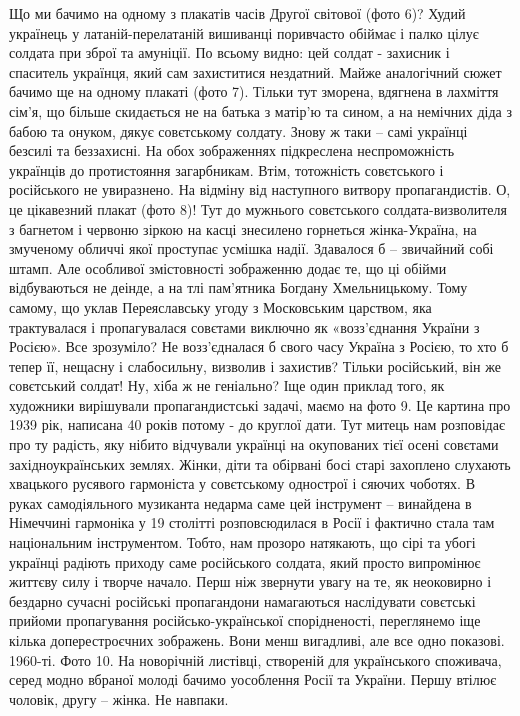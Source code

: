 Що ми бачимо на одному з плакатів часів Другої світової (фото 6)? Худий українець у латаній-перелатаній вишиванці поривчасто обіймає і палко цілує солдата при зброї та амуніції.  По всьому видно: цей солдат - захисник і спаситель українця, який сам захиститися нездатний. Майже аналогічний сюжет бачимо ще на одному плакаті (фото 7). Тільки тут зморена, вдягнена в лахміття сім’я, що більше скидається не на батька з матір’ю та сином, а на немічних діда з бабою та онуком, дякує совєтському  солдату. Знову ж таки – самі українці безсилі та беззахисні. 
На обох зображеннях підкреслена неспроможність українців до протистояння загарбникам. Втім, тотожність совєтського і російського не увиразнено. На відміну від наступного витвору пропагандистів. 
О, це цікавезний плакат (фото 8)! Тут до мужнього совєтського солдата-визволителя з багнетом і червоню зіркою на касці знесилено горнеться жінка-Україна, на змученому обличчі якої проступає усмішка надії. Здавалося б – звичайний собі штамп. Але особливої змістовності зображенню додає те, що ці обійми відбуваються не деінде, а на тлі пам’ятника Богдану Хмельницькому. Тому самому, що уклав Переяславську угоду з Московським царством, яка трактувалася і пропагувалася совєтами виключно як «возз’єднання України з Росією». Все зрозуміло? Не возз’єдналася б свого часу Україна з Росією, то хто б тепер її, нещасну і слабосильну, визволив і захистив? Тільки російський, він же совєтський солдат! Ну, хіба ж не геніально?
Іще один приклад того, як художники вирішували пропагандистські задачі, маємо на фото 9. Це картина про 1939 рік, написана 40 років потому - до круглої дати. Тут митець нам розповідає про ту радість, яку нібито відчували українці на окупованих тієї осені совєтами західноукраїнських землях. Жінки, діти та обірвані босі старі захоплено слухають хвацького русявого гармоніста у совєтському однострої і сяючих чоботях. В руках самодіяльного музиканта недарма саме цей інструмент – винайдена в Німеччині гармоніка у 19 столітті розповсюдилася в Росії і фактично стала там національним інструментом. Тобто, нам прозоро натякають, що сірі та убогі українці радіють приходу саме російського солдата, який просто випромінює життєву силу і творче начало.
Перш ніж звернути увагу на те, як неоковирно і бездарно сучасні російські пропагандони намагаються наслідувати совєтські прийоми пропагування російсько-української спорідненості, переглянемо іще кілька доперестроєчних зображень. Вони менш вигадливі, але все одно показові. 
1960-ті. Фото 10. На новорічній листівці, створеній для українського споживача, серед модно вбраної молоді бачимо уособлення Росії та України. Першу втілює чоловік, другу – жінка. Не навпаки. 
